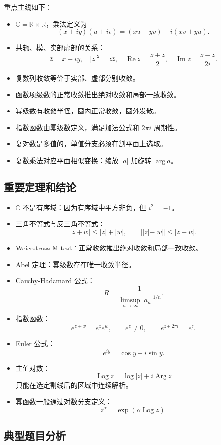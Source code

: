 \documentclass{article}
\newcommand{\C}{\mathbb{C}}
\newcommand{\R}{\mathbb{R}}
\DeclareMathOperator{\Log}{Log}
\DeclareMathOperator{\Arg}{Arg}
\begin{document}
重点主线如下：

\begin{itemize}
\item
  $\C=\R\times\R$，乘法定义为 \[
  (x+iy)(u+iv)=(xu-yv)+i(xv+yu).
  \]
\item
  共轭、模、实部虚部的关系： \[
  \bar z=x-iy,\quad |z|^2=z\bar z,\quad
  \operatorname{Re} z=\frac{z+\bar z}{2},\quad
  \operatorname{Im} z=\frac{z-\bar z}{2i}.
  \]
\item
  复数列收敛等价于实部、虚部分别收敛。
\item
  函数项级数的正常收敛推出绝对收敛和局部一致收敛。
\item
  幂级数有收敛半径，圆内正常收敛，圆外发散。
\item
  指数函数由幂级数定义，满足加法公式和 $2\pi i$ 周期性。
\item
  复对数是多值的，单值分支必须在割平面上选取。
\item
  复数乘法对应平面相似变换：缩放 $|a|$ 加旋转
  $\arg a$。
\end{itemize}

\subsection{重要定理和结论}

\begin{itemize}
\item
  $\C$ 不是有序域：因为有序域中平方非负，但 $i^2=-1$。
\item
  三角不等式与反三角不等式： \[
  |z+w|\le |z|+|w|,\qquad ||z|-|w||\le |z-w|.
  \]
\item
  Weierstrass M-test：正常收敛推出绝对收敛和局部一致收敛。
\item
  Abel 定理：幂级数存在唯一收敛半径。
\item
  Cauchy-Hadamard 公式： \[
  R=\frac{1}{\limsup_{n\to\infty}|a_n|^{1/n}}.
  \]
\item
  指数函数： \[
  e^{z+w}=e^z e^w,\qquad e^z\ne 0,\qquad e^{z+2\pi i}=e^z.
  \]
\item
  Euler 公式： \[
  e^{iy}=\cos y+i\sin y.
  \]
\item
  主值对数： \[
  \Log z=\log|z|+i\Arg z
  \] 只能在选定割线后的区域中连续解析。
\item
  幂函数一般通过对数分支定义： \[
  z^\alpha=\exp(\alpha \Log z).
  \]
\end{itemize}

\subsection{典型题目分析}
\end{document}
